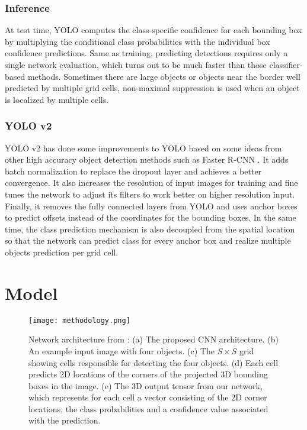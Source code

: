 \subsubsection{Inference}
At test time, YOLO computes the class-specific confidence for each bounding box by multiplying the conditional class probabilities with the individual box confidence predictions. Same as training, predicting detections requires only a single network evaluation, which turns out to be much faster than those classifier-based methods. Sometimes there are large objects or objects near the border well predicted by multiple grid cells, non-maximal suppression is used when an object is localized by multiple cells.

\subsubsection{YOLO v2}
YOLO v2 has done some improvements to YOLO based on some ideas from other high accuracy object detection methods such as Faster R-CNN \cite{}. It adds batch normalization to replace the dropout layer and achieves a better convergence. It also increases the resolution of input images for training and fine tunes the network to adjust its filters to work better on higher resolution input. Finally, it removes the fully connected layers from YOLO and uses anchor boxes to predict offsets instead of the coordinates for the bounding boxes. In the same time, the class prediction mechanism is also decoupled from the spatial location so that the network can predict class for every anchor box and realize multiple objects prediction per grid cell.

\section{Model}

\begin{figure}
  \texttt{[image: methodology.png]}
  \caption{Network architecture from \cite{tekin2018real}: (a) The proposed CNN architecture. (b) An example input image with four objects. (c) The $S \times S$ grid showing cells responsible for detecting the four objects. (d) Each cell predicts 2D locations of the corners of the projected 3D bounding boxes in the image. (e) The 3D output tensor from our network, which represents for each cell a vector consisting of the 2D corner locations, the class probabilities and a confidence value associated with the prediction.}
  \label{fig:methodology}
\end{figure}

